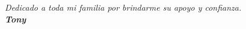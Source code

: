 \thispagestyle{empty}

\null\vfill

\begin{flushright}

\emph{Dedicado a toda mi familia por brindarme su apoyo y confianza.\\
    \vspace{1cm}
    \textbf{Tony}
}

\end{flushright}